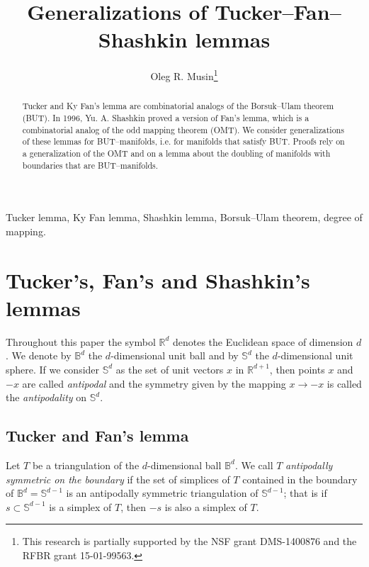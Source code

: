 \documentclass[a4paper,12pt]{article}
\title {Generalizations of Tucker--Fan--Shashkin lemmas}
\author {Oleg R. Musin\thanks{This research is partially supported by the NSF grant DMS-1400876 and the RFBR grant 15-01-99563.}}
\begin{document}
	\ifpdf {} \else
	 \fi	
	
\date{}
\maketitle



\begin{abstract} Tucker and Ky Fan's lemma are combinatorial analogs of the Borsuk--Ulam theorem (BUT). In 1996, Yu. A. Shashkin proved a version of Fan's lemma, which is a combinatorial analog of the odd mapping theorem (OMT).  We consider generalizations of these lemmas for BUT--manifolds, i.e. for manifolds that satisfy BUT. Proofs rely on a generalization of the OMT and on a lemma about the doubling of manifolds with boundaries that are BUT--manifolds.
\end{abstract}

\medskip

 Tucker lemma, Ky Fan lemma, Shashkin lemma, Borsuk--Ulam theorem, degree of mapping. 

\section{Tucker's, Fan's and Shashkin's lemmas}

Throughout this paper the symbol ${\mathbb R}^d$ denotes the Euclidean space of dimension $d$.  We denote by  ${\mathbb B}^d$ the $d$-dimensional unit ball and by  ${\mathbb S}^d$ the $d$-dimensional unit sphere. If we consider ${\mathbb S}^d$ as the set of unit vectors $x$ in ${\mathbb R}^{d+1}$, then points $x$ and $-x$ are called {\it antipodal} and the symmetry given by the mapping
 $x \to -x$ is called the {\it antipodality} on  ${\mathbb S}^d$.



\subsection{Tucker and Fan's lemma}



Let $T$ be a triangulation of the $d$-dimensional ball ${\mathbb B}^d$. We call $T$ {\it antipodally symmetric on the boundary}  if the set of simplices of $T$ contained in the boundary of  ${\mathbb B}^d = {\mathbb S}^{d-1}$ is an antipodally symmetric triangulation of  ${\mathbb S}^{d-1}$; that is if $s\subset {\mathbb S}^{d-1}$ is a simplex of $T$, then $-s$ is also a simplex of $T$.
\end{document}
